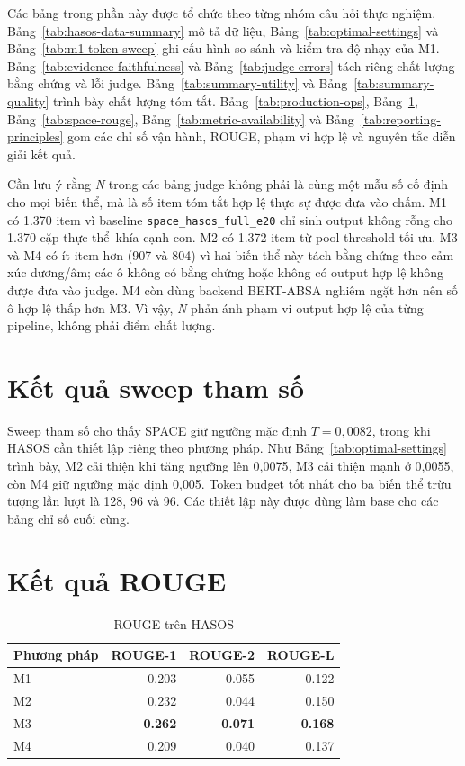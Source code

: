 \documentclass[12pt,a4paper]{report}
\begin{document}
Các bảng trong phần này được tổ chức theo từng nhóm câu hỏi thực nghiệm. Bảng~\ref{tab:hasos-data-summary} mô tả dữ liệu, Bảng~\ref{tab:optimal-settings} và Bảng~\ref{tab:m1-token-sweep} ghi cấu hình so sánh và kiểm tra độ nhạy của M1. Bảng~\ref{tab:evidence-faithfulness} và Bảng~\ref{tab:judge-errors} tách riêng chất lượng bằng chứng và lỗi judge. Bảng~\ref{tab:summary-utility} và Bảng~\ref{tab:summary-quality} trình bày chất lượng tóm tắt. Bảng~\ref{tab:production-ops}, Bảng~\ref{tab:production-rouge}, Bảng~\ref{tab:space-rouge}, Bảng~\ref{tab:metric-availability} và Bảng~\ref{tab:reporting-principles} gom các chỉ số vận hành, ROUGE, phạm vi hợp lệ và nguyên tắc diễn giải kết quả.

Cần lưu ý rằng \textit{N} trong các bảng judge không phải là cùng một mẫu số cố định cho mọi biến thể, mà là số item tóm tắt hợp lệ thực sự được đưa vào chấm. M1 có 1.370 item vì baseline \texttt{space\_hasos\_full\_e20} chỉ sinh output không rỗng cho 1.370 cặp thực thể--khía cạnh con. M2 có 1.372 item từ pool threshold tối ưu. M3 và M4 có ít item hơn (907 và 804) vì hai biến thể này tách bằng chứng theo cảm xúc dương/âm; các ô không có bằng chứng hoặc không có output hợp lệ không được đưa vào judge. M4 còn dùng backend BERT-ABSA nghiêm ngặt hơn nên số ô hợp lệ thấp hơn M3. Vì vậy, \textit{N} phản ánh phạm vi output hợp lệ của từng pipeline, không phải điểm chất lượng.

\FloatBarrier

\section{Kết quả sweep tham số}

Sweep tham số cho thấy SPACE giữ ngưỡng mặc định $T=0{,}0082$, trong khi HASOS cần thiết lập riêng theo phương pháp. Như Bảng~\ref{tab:optimal-settings} trình bày, M2 cải thiện khi tăng ngưỡng lên 0{,}0075, M3 cải thiện mạnh ở 0{,}0055, còn M4 giữ ngưỡng mặc định 0{,}005. Token budget tốt nhất cho ba biến thể trừu tượng lần lượt là 128, 96 và 96. Các thiết lập này được dùng làm base cho các bảng chỉ số cuối cùng.

\section{Kết quả ROUGE}

\begin{table}[tbp]
\centering
\caption{ROUGE trên HASOS}
\label{tab:production-rouge}
\begin{tabular}{l r r r}
\toprule
\textbf{Phương pháp} & \textbf{ROUGE-1} & \textbf{ROUGE-2} & \textbf{ROUGE-L} \\
\midrule
M1 & \num{0.203} & \num{0.055} & \num{0.122} \\
M2 & \num{0.232} & \num{0.044} & \num{0.150} \\
M3 & \textbf{\num{0.262}} & \textbf{\num{0.071}} & \textbf{\num{0.168}} \\
M4 & \num{0.209} & \num{0.040} & \num{0.137} \\
\bottomrule
\end{tabular}
\end{table}
\end{document}
